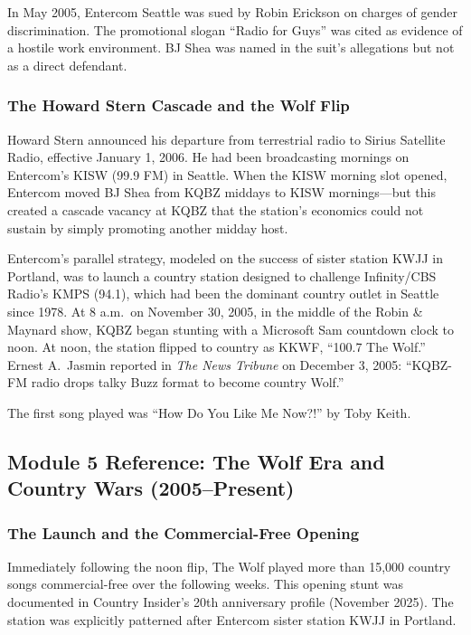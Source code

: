 \documentclass[11pt,letterpaper]{article}
\begin{document}
In May 2005, Entercom Seattle was sued by Robin Erickson on charges of gender discrimination. The promotional slogan ``Radio for Guys'' was cited as evidence of a hostile work environment. BJ Shea was named in the suit's allegations but not as a direct defendant.

\subsubsection{The Howard Stern Cascade and the Wolf Flip}

Howard Stern announced his departure from terrestrial radio to Sirius Satellite Radio, effective January 1, 2006. He had been broadcasting mornings on Entercom's KISW (99.9 FM) in Seattle. When the KISW morning slot opened, Entercom moved BJ Shea from KQBZ middays to KISW mornings---but this created a cascade vacancy at KQBZ that the station's economics could not sustain by simply promoting another midday host.

Entercom's parallel strategy, modeled on the success of sister station KWJJ in Portland, was to launch a country station designed to challenge Infinity/CBS Radio's KMPS (94.1), which had been the dominant country outlet in Seattle since 1978. At 8 a.m.\ on November 30, 2005, in the middle of the Robin \& Maynard show, KQBZ began stunting with a Microsoft Sam countdown clock to noon. At noon, the station flipped to country as KKWF, ``100.7 The Wolf.'' Ernest A.\ Jasmin reported in \textit{The News Tribune} on December 3, 2005: ``KQBZ-FM radio drops talky Buzz format to become country Wolf.''

The first song played was ``How Do You Like Me Now?!'' by Toby Keith.

\subsection{Module 5 Reference: The Wolf Era and Country Wars (2005--Present)}

\subsubsection{The Launch and the Commercial-Free Opening}

Immediately following the noon flip, The Wolf played more than 15,000 country songs commercial-free over the following weeks. This opening stunt was documented in Country Insider's 20th anniversary profile (November 2025). The station was explicitly patterned after Entercom sister station KWJJ in Portland.
\end{document}
